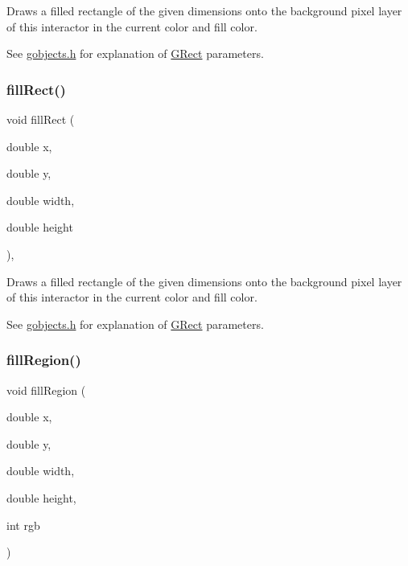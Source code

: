 Draws a filled rectangle of the given dimensions onto the background pixel layer of this interactor in the current color and fill color. 

See \mbox{\hyperlink{gobjects_8h_source}{gobjects.\+h}} for explanation of \mbox{\hyperlink{classGRect}{G\+Rect}} parameters. \mbox{\label{classGDrawingSurface_aac3ae7d3aee950de78eca0e108352254}} 
\subsubsection{\texorpdfstring{fill\+Rect()}{fillRect()}\hspace{0.1cm}{\footnotesize\ttfamily [2/2]}}
{\footnotesize\ttfamily void fill\+Rect (\begin{DoxyParamCaption}\item[{double}]{x,  }\item[{double}]{y,  }\item[{double}]{width,  }\item[{double}]{height }\end{DoxyParamCaption})\hspace{0.3cm}{\ttfamily [virtual]}, {\ttfamily [inherited]}}



Draws a filled rectangle of the given dimensions onto the background pixel layer of this interactor in the current color and fill color. 

See \mbox{\hyperlink{gobjects_8h_source}{gobjects.\+h}} for explanation of \mbox{\hyperlink{classGRect}{G\+Rect}} parameters. \mbox{\label{classGCanvas_af4146bdcb26135b739b9b4f13db03435}} 
\subsubsection{\texorpdfstring{fill\+Region()}{fillRegion()}\hspace{0.1cm}{\footnotesize\ttfamily [1/2]}}
{\footnotesize\ttfamily void fill\+Region (\begin{DoxyParamCaption}\item[{double}]{x,  }\item[{double}]{y,  }\item[{double}]{width,  }\item[{double}]{height,  }\item[{int}]{rgb }\end{DoxyParamCaption})\hspace{0.3cm}{\ttfamily [virtual]}}



